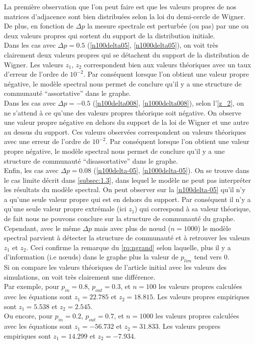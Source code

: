 La première observation que l'on peut faire est que les valeurs propres de nos matrices d'adjacence sont bien distribuées selon la loi du demi-cercle de Wigner.
De plus, en fonction de $\Delta p$ la mesure spectrale est perturbée (ou pas) par une ou deux valeurs propres qui sortent du support de la distribution initiale.\\

Dans les cas avec $\Delta p = 0.5$ (\autoref{n100delta05}, \autoref{n1000delta05}), on voit très clairement deux valeurs propres qui se détachent du support de la distribution de Wigner.
Les valeurs $z_1$, $z_2$ correspondent bien aux valeurs théoriques avec un taux d'erreur de l'ordre de $10^{-2}$.
Par conséquent lorsque l'on obtient une valeur propre négative, le modèle spectral nous permet de conclure qu'il y a une structure de communauté ``assortative'' dans le graphe.\\

Dans les cas avec $\Delta p = -0.5$ (\autoref{n100delta008}, \autoref{n1000delta008}), selon l'\autoref{z_2}, on ne s'attend à ce qu'une des valeurs propres théorique soit négative.
On observe une valeur propre négative en dehors du support de la loi de Wigner et une autre au dessus du support.
Ces valeurs observées correspondent on valeurs théoriques avec une erreur de l'ordre de $10^{-2}$.
Par conséquent lorsque l'on obtient une valeur propre négative, le modèle spectral nous permet de conclure qu'il y a une structure de communauté ``disassortative'' dans le graphe.\\

Enfin, les cas avec $\Delta p = 0.08$ (\autoref{n100delta-05}, \autoref{n1000delta-05}). 
On se trouve dans le cas limite décrit dans \autoref{subsec:1.3}, dans lequel le modèle ne peut pas interpréter les résultats du modèle spectral.
On peut observer sur la \autoref{n100delta-05} qu'il n'y a qu'une seule valeur propre qui est en dehors du support.
Par conséquent il n'y a qu'une seule valeur propre extrémale (ici $z_1$) qui correspond à sa valeur théorique, de fait nous ne pouvons conclure sur la structure de communauté du graphe.
Cependant, avec le même $\Delta p$ mais avec plus de nœud ($n = 1000$) le modèle spectral parvient à détecter la structure de communauté et à retrouver les valeurs $z_1$ et $z_2$.  
Ceci confirme la remarque du \autoref{rq:ngrand} selon laquelle, plus il y a d’information (i.e nœuds) dans le graphe plus la valeur de $p_{lim}$ tend vers $0$.\\

Si on compare les valeurs théoriques de l'article initial \cite{raj_rao} avec les valeurs des simulations, on voit très clairement une différence.\\
Par exemple, pour $p_{in} = 0.8$, $p_{out}=0.3$, et $n=100$ les valeurs propres calculées avec les équations  sont $z_1 = 22.785$ et $z_2 = 18.815$.
Les valeurs propres empiriques sont $z_1 = 5.538$ et $z_2 = 2.545$.\\
Ou encore, pour $p_{in} = 0.2$, $p_{out}=0.7$, et $n=1000$ les valeurs propres calculées avec les équations  sont $z_1 = -56.732$ et $z_2 = 31.833$.
Les valeurs propres empiriques sont $z_1 = 14.299$ et $z_2 = -7.934$.
